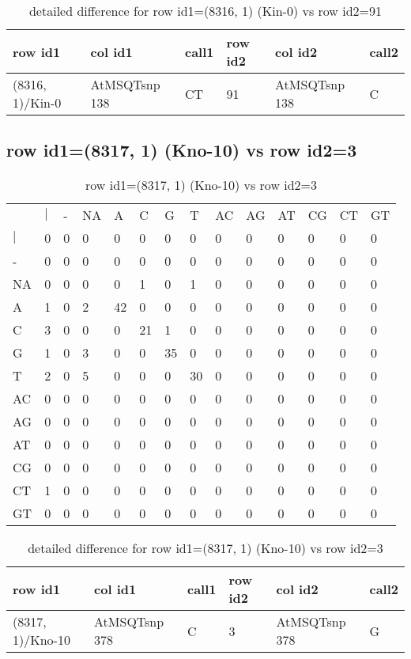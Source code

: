 \begin{center}
\begin{longtable}{|l|l|l|l|l|l|}
\caption{detailed difference for row id1=(8316, 1) (Kin-0) vs row id2=91} \label{table_dm501}\\
\hline
row id1&col id1&call1&row id2&col id2&call2\\
\hline
(8316, 1)/Kin-0&AtMSQTsnp 138&CT&91&AtMSQTsnp 138&C\\
\hline
\end{longtable}
\end{center}

\subsection{row id1=(8317, 1) (Kno-10) vs row id2=3}
\begin{center}
\begin{longtable}{|l|l|l|l|l|l|l|l|l|l|l|l|l|l|}
\caption{row id1=(8317, 1) (Kno-10) vs row id2=3} \label{table_dm502}\\
\hline
\\
\hline
&$|$&-&NA&A&C&G&T&AC&AG&AT&CG&CT&GT\\
$|$&0&0&0&0&0&0&0&0&0&0&0&0&0\\
-&0&0&0&0&0&0&0&0&0&0&0&0&0\\
NA&0&0&0&0&1&0&1&0&0&0&0&0&0\\
A&1&0&2&42&0&0&0&0&0&0&0&0&0\\
C&3&0&0&0&21&1&0&0&0&0&0&0&0\\
G&1&0&3&0&0&35&0&0&0&0&0&0&0\\
T&2&0&5&0&0&0&30&0&0&0&0&0&0\\
AC&0&0&0&0&0&0&0&0&0&0&0&0&0\\
AG&0&0&0&0&0&0&0&0&0&0&0&0&0\\
AT&0&0&0&0&0&0&0&0&0&0&0&0&0\\
CG&0&0&0&0&0&0&0&0&0&0&0&0&0\\
CT&1&0&0&0&0&0&0&0&0&0&0&0&0\\
GT&0&0&0&0&0&0&0&0&0&0&0&0&0\\
\hline
\end{longtable}
\end{center}

\begin{center}
\begin{longtable}{|l|l|l|l|l|l|}
\caption{detailed difference for row id1=(8317, 1) (Kno-10) vs row id2=3} \label{table_dm503}\\
\hline
row id1&col id1&call1&row id2&col id2&call2\\
\hline
(8317, 1)/Kno-10&AtMSQTsnp 378&C&3&AtMSQTsnp 378&G\\
\hline
\end{longtable}
\end{center}

